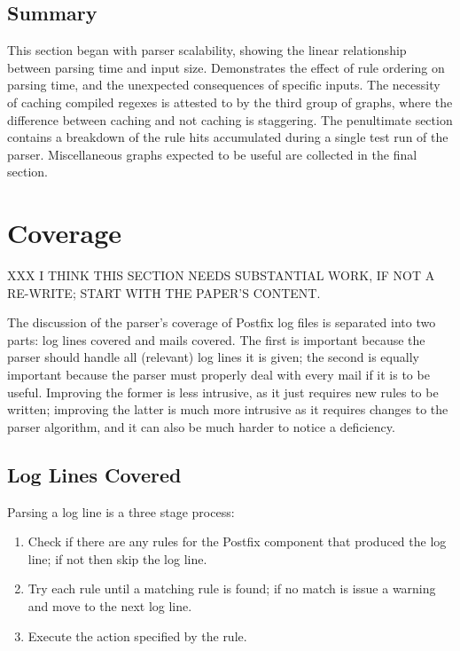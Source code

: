 \subsection{Summary}

This section began with parser scalability, showing the linear relationship
between parsing time and input size.  Demonstrates the effect of rule
ordering on parsing time, and the unexpected consequences of specific
inputs.  The necessity of caching compiled regexes is attested to by the
third group of graphs, where the difference between caching and not caching
is staggering.  The penultimate section contains a breakdown of the rule
hits accumulated during a single test run of the parser.  Miscellaneous
graphs expected to be useful are collected in the final section.

\section{Coverage}

XXX I THINK THIS SECTION NEEDS SUBSTANTIAL WORK, IF NOT A RE-WRITE\@; START
WITH THE PAPER'S CONTENT\@.

\label{parsing coverage}

The discussion of the parser's coverage of Postfix log files is separated
into two parts: log lines covered and mails covered.  The first is
important because the parser should handle all (relevant) log lines it is
given; the second is equally important because the parser must properly
deal with every mail if it is to be useful.  Improving the former is
less intrusive, as it just requires new rules to be written; improving the
latter is much more intrusive as it requires changes to the parser
algorithm, and it can also be much harder to notice a deficiency.

\subsection{Log Lines Covered}

\label{log-lines-covered}

Parsing a log line is a three stage process:

\begin{enumerate}

    \item Check if there are any rules for the Postfix component that
        produced the log line; if not then skip the log line.

    \item Try each rule until a matching rule is found; if no match is
        issue a warning and move to the next log line.

    \item Execute the action specified by the rule.

\end{enumerate}

